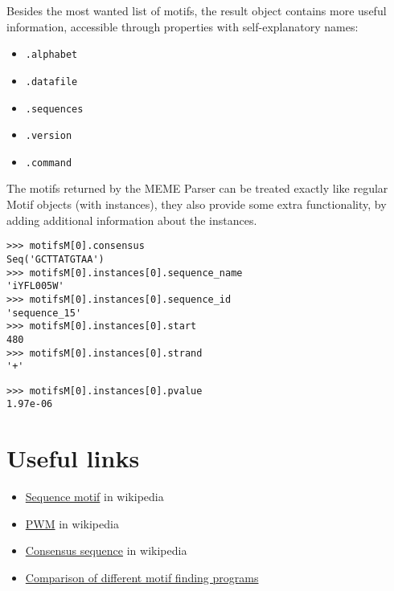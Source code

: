 Besides the most wanted list of motifs, the result object contains more useful information, accessible through properties with self-explanatory names:
\begin{itemize}
\item \verb|.alphabet|
\item \verb|.datafile|
\item \verb|.sequences|
\item \verb|.version|
\item \verb|.command|
\end{itemize}

The motifs returned by the MEME Parser can be treated exactly like regular
Motif objects (with instances), they also provide some extra
functionality, by adding additional information about the instances.

\begin{verbatim}
>>> motifsM[0].consensus
Seq('GCTTATGTAA')
>>> motifsM[0].instances[0].sequence_name
'iYFL005W'
>>> motifsM[0].instances[0].sequence_id
'sequence_15'
>>> motifsM[0].instances[0].start
480
>>> motifsM[0].instances[0].strand
'+'
\end{verbatim}
\begin{verbatim}
>>> motifsM[0].instances[0].pvalue
1.97e-06
\end{verbatim}


\section{Useful links}
\label{sec:links}


\begin{itemize}
\item \href{https://en.wikipedia.org/wiki/Sequence_motif}{Sequence motif} in wikipedia
\item \href{https://en.wikipedia.org/wiki/Position_weight_matrix}{PWM} in wikipedia
\item \href{https://en.wikipedia.org/wiki/Consensus_sequence}{Consensus sequence} in wikipedia
\item \href{http://bio.cs.washington.edu/assessment/}{Comparison of different motif finding programs}
\end{itemize}
